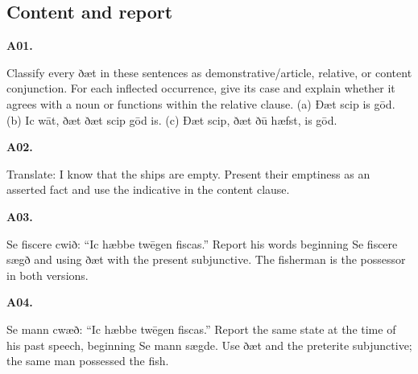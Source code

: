 \subsection*{Content and report}

\par\begin{minipage}{\linewidth}\raggedright
\textbf{A01.}

Classify every ðæt in these sentences as demonstrative/\allowbreak{}article, relative, or content conjunction. For each inflected occurrence, give its case and explain whether it agrees with a noun or functions within the relative clause. (a) Ðæt scip is gōd. (b) Ic wāt, ðæt ðæt scip gōd is. (c) Ðæt scip, ðæt ðū hæfst, is gōd.

\end{minipage}\par\addvspace{4pt}

\par\begin{minipage}{\linewidth}\raggedright
\textbf{A02.}

Translate: I know that the ships are empty. Present their emptiness as an asserted fact and use the indicative in the content clause.

\end{minipage}\par\addvspace{4pt}

\par\begin{minipage}{\linewidth}\raggedright
\textbf{A03.}

Se fiscere cwið: “Ic hæbbe twēgen fiscas.” Report his words beginning Se fiscere sægð and using ðæt with the present subjunctive. The fisherman is the possessor in both versions.

\end{minipage}\par\addvspace{4pt}

\par\begin{minipage}{\linewidth}\raggedright
\textbf{A04.}

Se mann cwæð: “Ic hæbbe twēgen fiscas.” Report the same state at the time of his past speech, beginning Se mann sægde. Use ðæt and the preterite subjunctive; the same man possessed the fish.

\end{minipage}\par\addvspace{4pt}

